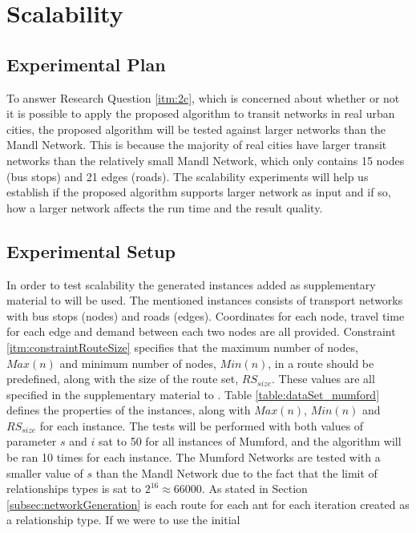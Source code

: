 \section{Scalability}

\subsection{Experimental Plan}
To answer Research Question \vref{itm:2c}, which is concerned about whether or not it is possible to apply the proposed algorithm to transit networks in real urban cities, the proposed algorithm will be tested against larger networks than the Mandl Network. This is because the majority of real cities have larger transit networks than the relatively small Mandl Network, which only contains 15 nodes (bus stops) and 21 edges (roads). The scalability experiments will help us establish if the proposed algorithm supports larger network as input and if so, how a larger network affects the run time and the result quality.


\subsection{Experimental Setup}
\label{subsec:scalabilityExperiments_setup}

In order to test scalability the generated instances added as supplementary material to \citet{mumford13} will be used.
The mentioned instances consists of transport networks with bus stops (nodes) and roads (edges). Coordinates for each node, travel time for each edge and demand between each two nodes are all provided. Constraint \vref{itm:constraintRouteSize} specifies that the maximum number of nodes, $Max(n)$ and minimum number of nodes, $Min(n)$, in a route should be predefined, along with the size of the route set, $RS_{size}$. These values are all specified in the supplementary material to \citet{mumford13}. Table \vref{table:dataSet_mumford} defines the properties of the instances, along with $Max(n)$, $Min(n)$ and $RS_{size}$ for each instance. The tests will be performed with both values of parameter $s$ and $i$ sat to 50 for all instances of Mumford, and the algorithm will be ran 10 times for each instance. The Mumford Networks are tested with a smaller value of $s$ than the Mandl Network due to the fact that the limit of relationships types is sat to $2^{16} \approx 66 000$. As stated in Section \vref{subsec:networkGeneration} is each route for each ant for each iteration created as a relationship type. If we were to use the initial  

